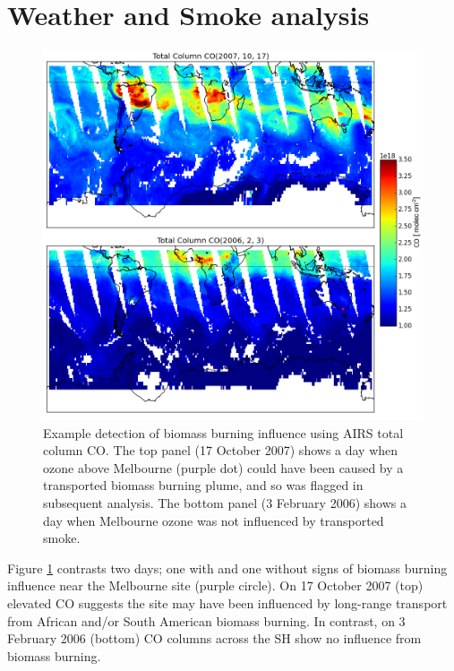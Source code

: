 
\section{Weather and Smoke analysis}
  \label{sec:WeatherSmoke}
  
  \begin{figure}[t]
      \includegraphics[width=12cm]{../figures/AIRS_compare.png}
      \caption{ %
	Example detection of biomass burning influence using AIRS total column CO. 
	The top panel (17 October 2007) shows a day when ozone above Melbourne (purple dot) could have been caused by a transported biomass burning plume, and so was flagged in subsequent analysis.
	The bottom panel (3 February 2006) shows a day when Melbourne ozone was not influenced by transported smoke.
	}
      \label{fig:excludedeg}
    \end{figure}

    Figure \ref{fig:excludedeg} contrasts two days; one with and one without signs of biomass burning influence near the Melbourne site (purple circle).
    On 17 October 2007 (top) elevated CO suggests the site may have been influenced by long-range transport from African and/or South American biomass burning.
    In contrast, on 3 February 2006 (bottom) CO columns across the SH show no influence from biomass burning.
    
